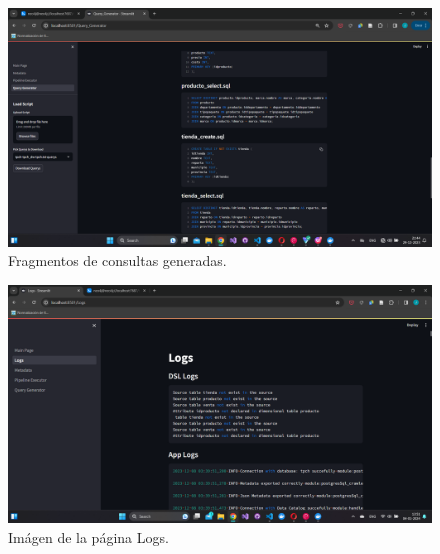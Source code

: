\begin{annexes}
    \begin{figure}
        \centering
        \includegraphics[scale=0.4]{Graphics/generatedquerys1.png}
        \caption{Fragmentos de consultas generadas.}
        \label{fig:qfragment}
    \end{figure}

    \begin{figure}
        \centering
        \includegraphics[scale=0.4]{Graphics/logs.png}
        \caption{Im\'agen de la p\'agina Logs.}
        \label{fig:logs}
    \end{figure}
\end{annexes}